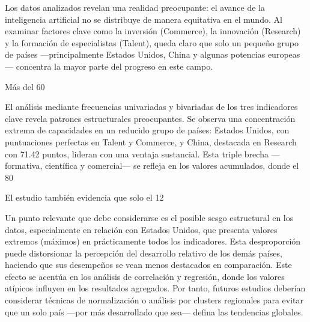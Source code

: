\documentclass[
]{article}
\begin{document}
\begin{multicols}{2}
Los datos analizados revelan una realidad preocupante: el avance de la inteligencia artificial no se distribuye de manera equitativa en el mundo. Al examinar factores clave como la inversión (Commerce), la innovación (Research) y la formación de especialistas (Talent), queda claro que solo un pequeño grupo de países —principalmente Estados Unidos, China y algunas potencias europeas— concentra la mayor parte del progreso en este campo.

Más del 60%

El análisis mediante frecuencias univariadas y bivariadas de los tres indicadores clave revela patrones estructurales preocupantes. Se observa una concentración extrema de capacidades en un reducido grupo de países: Estados Unidos, con puntuaciones perfectas en Talent y Commerce, y China, destacada en Research con 71.42 puntos, lideran con una ventaja sustancial. Esta triple brecha —formativa, científica y comercial— se refleja en los valores acumulados, donde el 80%

El estudio también evidencia que solo el 12%

Un punto relevante que debe considerarse es el posible sesgo estructural en los datos, especialmente en relación con Estados Unidos, que presenta valores extremos (máximos) en prácticamente todos los indicadores. Esta desproporción puede distorsionar la percepción del desarrollo relativo de los demás países, haciendo que sus desempeños se vean menos destacados en comparación. Este efecto se acentúa en los análisis de correlación y regresión, donde los valores atípicos influyen en los resultados agregados. Por tanto, futuros estudios deberían considerar técnicas de normalización o análisis por clusters regionales para evitar que un solo país —por más desarrollado que sea— defina las tendencias globales.


\end{multicols}
\end{document}

